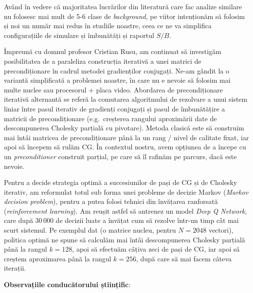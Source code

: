 Având în vedere că majoritatea lucrărilor din literatură care fac analize similare nu folosesc mai mult de 5-6 clase de \textit{background}, pe viitor intenționăm să folosim și noi un număr mai redus în studiile noastre, ceea ce ne va simplifica configurațiile de simulare și îmbunătăți și raportul \(S/B\).

Împreună cu domnul profesor Cristian Rusu, am continuat să investigăm posibilitatea de a paraleliza construcția iterativă a unei matrici de precondiționare în cadrul metodei gradienților conjugați. Ne-am gândit la o variantă simplificată a problemei noastre, în care nu e nevoie să folosim mai multe nuclee sau procesorul + placa video. Abordarea de precondiționare iterativă alternantă se referă la comutarea algoritmului de rezolvare a unui sistem liniar între pasul iterativ de gradienți conjugați și pasul de îmbunătățire a matricii de precondiționare (e.g.~creșterea rangului aproximării date de descompunerea Cholesky parțială cu pivotare). Metoda clasică este să construim mai întâi matricea de precondiționare până la un rang / nivel de calitate fixat, iar apoi să începem să rulăm CG. În contextul nostru, avem opțiunea de a începe cu un \textit{preconditioner} construit parțial, pe care să îl rafinăm pe parcurs, dacă este nevoie.

Pentru a decide strategia optimă a succesiunilor de pași de CG și de Cholesky iterativ, am reformulat totul sub forma unei probleme de decizie Markov (\textit{Markov decision problem}), pentru a putea folosi tehnici din învățarea ranforsată (\textit{reinforcement learning}). Am reușit astfel să antrenez un model \textit{Deep Q Network}, care după \(30\,000\) de decizii luate a învățat cum să rezolve într-un timp cât mai scurt sistemul. Pe exemplul dat (o matrice nucleu, pentru \(N = 2048\) vectori), politica optimă ne spune să calculăm mai întâi descompunerea Cholesky parțială până la rangul \(k = 128\), apoi să efectuăm câțiva zeci de pași de CG, iar apoi să creștem aproximarea până la rangul \(k = 256\), după care să mai facem câteva iterații.

\textbf{Observațiile conducătorului științific}:

